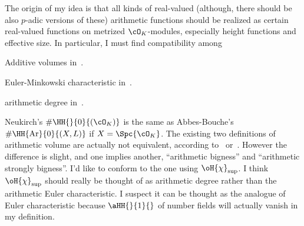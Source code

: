 \documentclass[article, a4paper, twoside]{universal}
\begin{document}




The origin of my idea is that all kinds of real-valued (although, there should be also $p$-adic versions of these) arithmetic functions should be realized as certain real-valued functions on metrized $\cO_{K}$-modules, especially height functions and effective size. In particular, I must find compatibility among
\begin{enr}
	\item Additive volumes in~\cite{AB1995}.
	\item Euler-Minkowski characteristic in~\cite{Neukirch1999}.
	\item arithmetic degree in~\cite{GS1990Arithmetic}.
\end{enr}
 Neukirch's $\#\HH{}{0}{(\cO_{K})}$ is the same as Abbes-Bouche's $\#\HH{\mathrm{Ar}}{0}{(X,L)}$ if $X=\Spc{\cO_{K}}$.
 The existing two definitions of arithmetic volume are actually not equivalent, according to~\cite[Page~368]{Chen2011} or~\cite[Page~613]{Yuan2008Big}. However the difference is slight, and one implies another, ``arithmetic bigness'' and ``arithmetic strongly bigness''. I'd like to conform to the one using $\oH{\chi}_{\mathrm{sup}}$.
 I think $\oH{\chi}_{\mathrm{sup}}$ should really be thought of as arithmetic degree rather than the arithmetic Euler characteristic. I suspect it can be thought as the analogue of Euler characteristic because $\aHH{}{1}{}$ of number fields will actually vanish in my definition.
\end{document}
